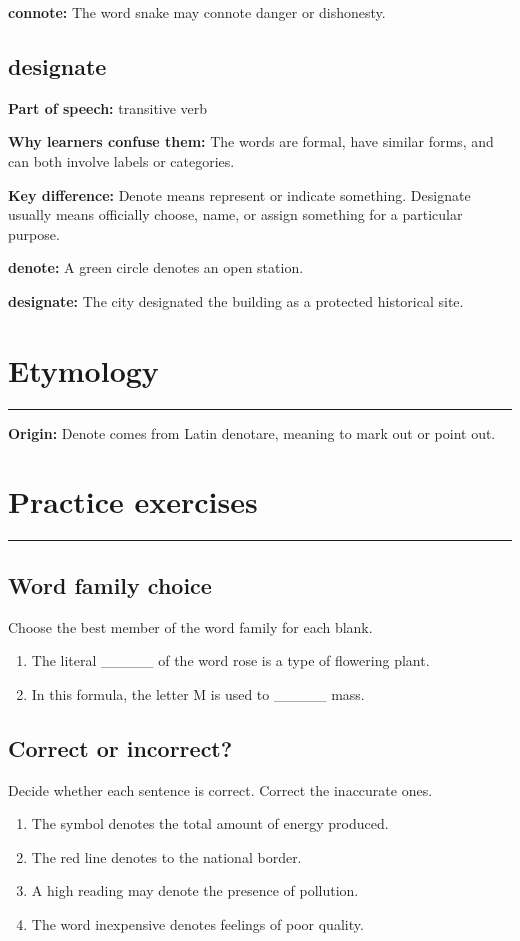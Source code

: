 \documentclass[11pt]{article}
\newcommand{\sectionrule}{\par\vspace{-0.5em}\noindent\textcolor{Accent}{\rule{\linewidth}{0.6pt}}\par}
\begin{document}
\textbf{connote:} The word snake may connote danger or dishonesty.

\subsection{designate}
\textbf{Part of speech:} transitive verb

\textbf{Why learners confuse them:} The words are formal, have similar forms, and can both involve labels or categories.

\textbf{Key difference:} Denote means represent or indicate something. Designate usually means officially choose, name, or assign something for a particular purpose.

\textbf{denote:} A green circle denotes an open station.

\textbf{designate:} The city designated the building as a protected historical site.

\section{Etymology}
\sectionrule
\textbf{Origin:} Denote comes from Latin denotare, meaning to mark out or point out.

\section{Practice exercises}
\sectionrule
\subsection{Word family choice}
Choose the best member of the word family for each blank.

\begin{enumerate}
  \item The literal \_\_\_\_\_ of the word rose is a type of flowering plant.
  \item In this formula, the letter M is used to \_\_\_\_\_ mass.
\end{enumerate}

\subsection{Correct or incorrect?}
Decide whether each sentence is correct. Correct the inaccurate ones.

\begin{enumerate}
  \item The symbol denotes the total amount of energy produced.
  \item The red line denotes to the national border.
  \item A high reading may denote the presence of pollution.
  \item The word inexpensive denotes feelings of poor quality.
\end{enumerate}
\end{document}
